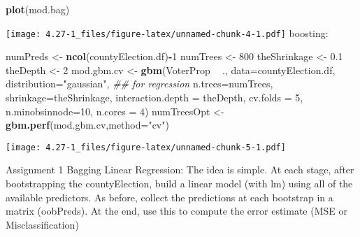\documentclass[]{article}
\newenvironment{Shaded}{\begin{snugshade}}{\end{snugshade}}
\newcommand{\CommentTok}[1]{\textcolor[rgb]{0.56,0.35,0.01}{\textit{#1}}}
\newcommand{\DataTypeTok}[1]{\textcolor[rgb]{0.13,0.29,0.53}{#1}}
\newcommand{\DecValTok}[1]{\textcolor[rgb]{0.00,0.00,0.81}{#1}}
\newcommand{\FloatTok}[1]{\textcolor[rgb]{0.00,0.00,0.81}{#1}}
\newcommand{\KeywordTok}[1]{\textcolor[rgb]{0.13,0.29,0.53}{\textbf{#1}}}
\newcommand{\NormalTok}[1]{#1}
\newcommand{\OperatorTok}[1]{\textcolor[rgb]{0.81,0.36,0.00}{\textbf{#1}}}
\newcommand{\StringTok}[1]{\textcolor[rgb]{0.31,0.60,0.02}{#1}}
\begin{document}
\begin{Shaded}
\begin{Highlighting}[]
\KeywordTok{plot}\NormalTok{(mod.bag)}
\end{Highlighting}
\end{Shaded}

\texttt{[image: 4.27-1\_files/figure-latex/unnamed-chunk-4-1.pdf]}
boosting:

\begin{Shaded}
\begin{Highlighting}[]
\NormalTok{numPreds <-}\StringTok{ }\KeywordTok{ncol}\NormalTok{(countyElection.df)}\OperatorTok{-}\DecValTok{1}
\NormalTok{numTrees <-}\StringTok{ }\DecValTok{800}
\NormalTok{theShrinkage <-}\StringTok{ }\FloatTok{0.1}
\NormalTok{theDepth <-}\StringTok{ }\DecValTok{2}
\NormalTok{mod.gbm.cv <-}\StringTok{ }\KeywordTok{gbm}\NormalTok{(VoterProp }\OperatorTok{~}\StringTok{ }\NormalTok{.,}
                  \DataTypeTok{data=}\NormalTok{countyElection.df,}
                  \DataTypeTok{distribution=}\StringTok{"gaussian"}\NormalTok{, }\CommentTok{## for regression}
                  \DataTypeTok{n.trees=}\NormalTok{numTrees,}
                  \DataTypeTok{shrinkage=}\NormalTok{theShrinkage,}
                  \DataTypeTok{interaction.depth =}\NormalTok{ theDepth,}
                  \DataTypeTok{cv.folds =} \DecValTok{5}\NormalTok{,}
                  \DataTypeTok{n.minobsinnode=}\DecValTok{10}\NormalTok{,}
                  \DataTypeTok{n.cores =} \DecValTok{4}\NormalTok{)}
\NormalTok{numTreesOpt <-}\StringTok{ }\KeywordTok{gbm.perf}\NormalTok{(mod.gbm.cv,}\DataTypeTok{method=}\StringTok{"cv"}\NormalTok{)}
\end{Highlighting}
\end{Shaded}

\texttt{[image: 4.27-1\_files/figure-latex/unnamed-chunk-5-1.pdf]}

Assignment 1 Bagging Linear Regression: The idea is simple. At each
stage, after bootstrapping the countyElection, build a linear model
(with lm) using all of the available predictors. As before, collect the
predictions at each bootstrap in a matrix (oobPreds). At the end, use
this to compute the error estimate (MSE or Misclassification)
\end{document}
